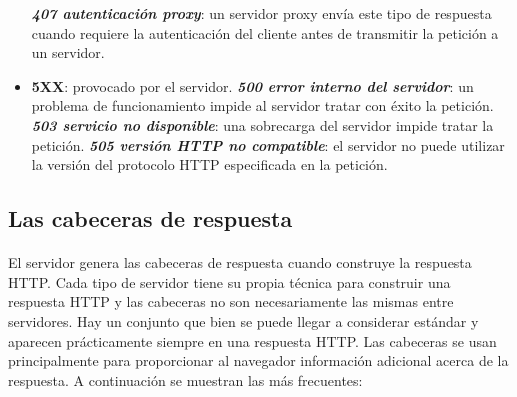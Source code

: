 \documentclass{article}
\begin{document}
\begin{itemize}
		 	\subitem \textbf{\textit{407 autenticación proxy}}: un servidor proxy envía este tipo de respuesta cuando requiere la autenticación del cliente antes de transmitir la petición a un servidor.
		 \item \textbf{5XX}: provocado por el servidor.
		 	\subitem \textbf{\textit{500 error interno del servidor}}: un problema de funcionamiento impide al servidor tratar con éxito la petición.
		 	\subitem \textbf{\textit{503 servicio no disponible}}: una sobrecarga del servidor impide tratar la petición.
		 	\subitem \textbf{\textit{505 versión HTTP no compatible}}: el servidor no puede utilizar la versión del protocolo HTTP especificada en la petición.
	\end{itemize}
	
	\subsection{Las cabeceras de respuesta}
	
	\paragraph{}El servidor genera las cabeceras de respuesta cuando construye la respuesta HTTP. Cada tipo de servidor tiene su propia técnica para construir una respuesta HTTP y las cabeceras no son necesariamente las mismas entre servidores. Hay un conjunto que bien se puede llegar a considerar estándar y aparecen prácticamente siempre en una respuesta HTTP. Las cabeceras se usan principalmente para proporcionar al navegador información adicional acerca de la respuesta. A continuación se muestran las más frecuentes:
	
\end{document}
